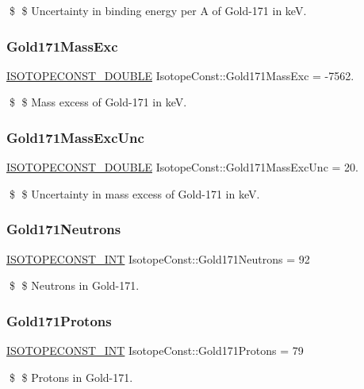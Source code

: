 \$ \$ Uncertainty in binding energy per A of Gold-\/171 in keV. \mbox{\label{group___isotope_const-_gold-_au171_ga5d1c050867e5a995c51c70793babba0f}} 
\subsubsection{\texorpdfstring{Gold171\+Mass\+Exc}{Gold171MassExc}}
{\footnotesize\ttfamily \mbox{\hyperlink{group___isotope_const-_macros_ga8f45a7272ce02c0b4c65c44636ed719a}{I\+S\+O\+T\+O\+P\+E\+C\+O\+N\+S\+T\+\_\+\+D\+O\+U\+B\+LE}} Isotope\+Const\+::\+Gold171\+Mass\+Exc = -\/7562.}

\$ \$ Mass excess of Gold-\/171 in keV. \mbox{\label{group___isotope_const-_gold-_au171_gabc318e8b509b10ffaa8b721fb0b26cc4}} 
\subsubsection{\texorpdfstring{Gold171\+Mass\+Exc\+Unc}{Gold171MassExcUnc}}
{\footnotesize\ttfamily \mbox{\hyperlink{group___isotope_const-_macros_ga8f45a7272ce02c0b4c65c44636ed719a}{I\+S\+O\+T\+O\+P\+E\+C\+O\+N\+S\+T\+\_\+\+D\+O\+U\+B\+LE}} Isotope\+Const\+::\+Gold171\+Mass\+Exc\+Unc = 20.}

\$ \$ Uncertainty in mass excess of Gold-\/171 in keV. \mbox{\label{group___isotope_const-_gold-_au171_ga284741b59cc540b504a1e1465d68997f}} 
\subsubsection{\texorpdfstring{Gold171\+Neutrons}{Gold171Neutrons}}
{\footnotesize\ttfamily \mbox{\hyperlink{group___isotope_const-_macros_ga5f18360b3e99483a35c32d789e62621c}{I\+S\+O\+T\+O\+P\+E\+C\+O\+N\+S\+T\+\_\+\+I\+NT}} Isotope\+Const\+::\+Gold171\+Neutrons = 92}

\$ \$ Neutrons in Gold-\/171. \mbox{\label{group___isotope_const-_gold-_au171_ga00e03e91fe74398e35e7deb11ec04432}} 
\subsubsection{\texorpdfstring{Gold171\+Protons}{Gold171Protons}}
{\footnotesize\ttfamily \mbox{\hyperlink{group___isotope_const-_macros_ga5f18360b3e99483a35c32d789e62621c}{I\+S\+O\+T\+O\+P\+E\+C\+O\+N\+S\+T\+\_\+\+I\+NT}} Isotope\+Const\+::\+Gold171\+Protons = 79}

\$ \$ Protons in Gold-\/171. 